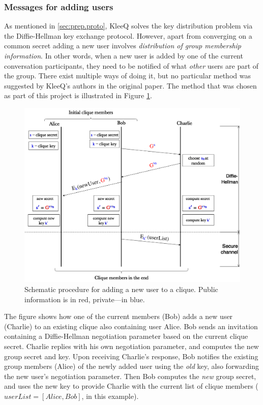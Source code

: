 \documentclass[a4paper, twoside, 12pt]{report}
\begin{document}
\subsubsection{Messages for adding users}
As mentioned in \cref{sec:prep.proto}, KleeQ solves the key distribution problem via the Diffie-Hellman key exchange protocol. However, apart from converging on a common secret adding a new user involves \emph{distribution of group membership information}. In other words, when a new user is added by one of the current conversation participants, they need to be notified of what \emph{other} users are part of the group. There exist multiple ways of doing it, but no particular method was suggested by KleeQ's authors in the original paper. The method that was chosen as part of this project is illustrated in Figure \ref{fig:CliqueFormation}.
\begin{figure}[H]
    \captionsetup{width=0.76\textwidth}
    \centering
    \includegraphics[width=0.76\linewidth]{pics/CliqueFormation.png}
    \caption{\label{fig:CliqueFormation} Schematic procedure for adding a new user to a clique. Public information is in {\color{red} red}, private---in {\color{blue} blue}.}
\end{figure}
The figure shows how one of the current members (Bob) adds a new user (Charlie) to an existing clique also containing user Alice. Bob sends an invitation containing a Diffie-Hellman negotiation parameter based on the current clique secret. Charlie replies with his own negotiation parameter, and computes the new group secret and key. Upon receiving Charlie's response, Bob notifies the existing group members (Alice) of the newly added user using the \emph{old} key, also forwarding the new user's negotiation parameter. Then Bob computes the \emph{new} group secret, and uses the new key to provide Charlie with the current list of clique members ($userList = [Alice, Bob]$, in this example). \\
\end{document}
